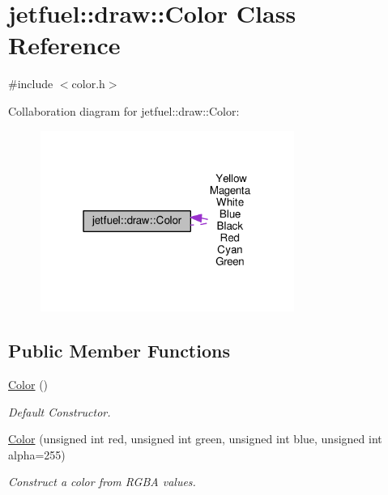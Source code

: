 \hypertarget{classjetfuel_1_1draw_1_1Color}{}\section{jetfuel\+:\+:draw\+:\+:Color Class Reference}
\label{classjetfuel_1_1draw_1_1Color}


{\ttfamily \#include $<$color.\+h$>$}



Collaboration diagram for jetfuel\+:\+:draw\+:\+:Color\+:
\nopagebreak
\begin{figure}[H]
\begin{center}
\leavevmode
\includegraphics[width=235pt]{classjetfuel_1_1draw_1_1Color__coll__graph}
\end{center}
\end{figure}
\subsection*{Public Member Functions}
\begin{DoxyCompactItemize}
\item 
\hyperlink{classjetfuel_1_1draw_1_1Color_a0deb50ab0c45f96bf039d595fda8d6c3}{Color} ()
\begin{DoxyCompactList}\small\item\em Default Constructor. \end{DoxyCompactList}\item 
\hyperlink{classjetfuel_1_1draw_1_1Color_a4fadffbafbdae0386fc71cf7626dc988}{Color} (unsigned int red, unsigned int green, unsigned int blue, unsigned int alpha=255)
\begin{DoxyCompactList}\small\item\em Construct a color from R\+G\+BA values. \end{DoxyCompactList}\end{DoxyCompactItemize}
